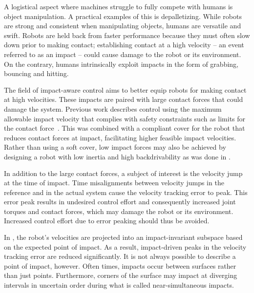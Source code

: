 \documentclass[a4paper, 10pt, conference]{ieeeconf}
\begin{document}
    A logistical aspect where machines struggle to fully compete with humans is object manipulation. A practical examples of this is depalletizing. While robots are strong and consistent when manipulating objects, humans are versatile and swift. Robots are held back from faster performance because they must often slow down prior to making contact; establishing contact at a high velocity -- an event referred to as an impact -- could cause damage to the robot or its environment. On the contrary, humans intrinsically exploit impacts in the form of grabbing, bouncing and hitting. %

    The field of impact-aware control aims to better equip robots for making contact at high velocities. These impacts are paired with large contact forces that could damage the system. Previous work describes control using the maximum allowable impact velocity that complies with safety constraints such as limits for the contact force~\cite{dehioRobotSafeImpactsSoft2021, dehioDualArmBoxGrabbing2022}. This was combined with a compliant cover for the robot that reduces contact forces at impact, facilitating higher feasible impact velocities. Rather than using a soft cover, low impact forces may also be achieved by designing a robot with low inertia and high backdrivability as was done in \cite{songDevelopmentLowInertiaHighStiffness2018}.

    In addition to the large contact forces, a subject of interest is the velocity jump at the time of impact. Time misalignments between velocity jumps in the reference and in the actual system cause the velocity tracking error to peak\cite{biemondTrackingControlMechanical2012}. This error peak results in undesired control effort and consequently increased joint torques and contact forces, which may damage the robot or its environment. Increased control effort due to error peaking should thus be avoided.

     In \cite{yangImpactInvariantControl2021}, the robot's velocities are projected into an impact-invariant subspace based on the expected point of impact. As a result, impact-driven peaks in the velocity tracking error are reduced significantly. It is not always possible to describe a point of impact, however. Often times, impacts occur between surfaces rather than just points. Furthermore, corners of the surface may impact at diverging intervals in uncertain order during what is called near-simultaneous impacts.
\end{document}
